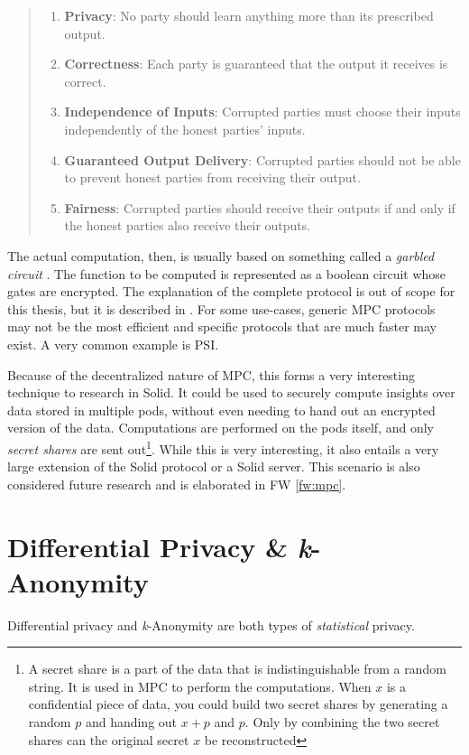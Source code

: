 \begin{quote}{\citet[p.2]{secure-mpc}}
\begin{enumerate}
    \item \textbf{Privacy}: No party should learn anything more than its prescribed output.
    \item \textbf{Correctness}: Each party is guaranteed that the output it receives is correct.
    \item \textbf{Independence of Inputs}: Corrupted parties must choose their inputs independently of the honest parties' inputs.
    \item \textbf{Guaranteed Output Delivery}: Corrupted parties should not be able to prevent honest parties from receiving their output.
    \item \textbf{Fairness}: Corrupted parties should receive their outputs if and only if the honest parties also receive their outputs.
\end{enumerate}
\end{quote}
The actual computation, then, is usually based on something called a \textit{garbled circuit} \citep{garbled-circuit}. The function to be computed is represented as a boolean circuit whose gates are encrypted. The explanation of the complete protocol is out of scope for this thesis, but it is described in \citet{secure-mpc, pragmatic-mpc}. For some use-cases, generic \gls{MPC} protocols may not be the most efficient and specific protocols that are much faster may exist. A very common example is \gls{PSI}.

Because of the decentralized nature of \gls{MPC}, this forms a very interesting technique to research in Solid. It could be used to securely compute insights over data stored in multiple pods, without even needing to hand out an encrypted version of the data. Computations are performed on the pods itself, and only \textit{secret shares} are sent out\footnote{A secret share is a part of the data that is indistinguishable from a random string. It is used in \gls{MPC} to perform the computations. When $x$ is a confidential piece of data, you could build two secret shares by generating a random $p$ and handing out $x + p$ and $p$. Only by combining the two secret shares can the original secret $x$ be reconstructed}. While this is very interesting, it also entails a very large extension of the Solid protocol or a Solid server. This scenario is also considered future research and is elaborated in FW \ref{fw:mpc}.

\section{Differential Privacy \& \textit{k}-Anonymity}
\label{sec:statistical-privacy}
Differential privacy and \textit{k}-Anonymity are both types of \textit{statistical} privacy. 

